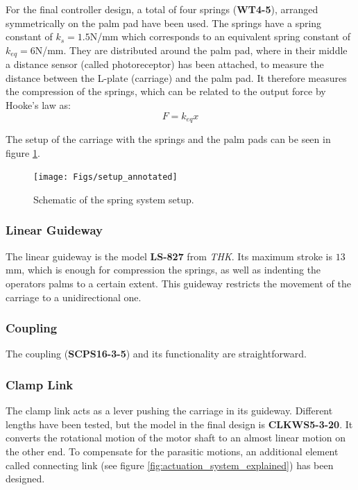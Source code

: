 For the final controller design, a total of four springs (\textbf{WT4-5}), arranged symmetrically on the palm pad have been used. The springs have a spring constant of $k_s = 1.5$N/mm which corresponds to an equivalent spring constant of $k_{eq} = 6$N/mm. They are distributed around the palm pad, where in their middle a distance sensor (called photoreceptor) has been attached, to measure the distance between the L-plate (carriage) and the palm pad. It therefore measures the compression of the springs, which can be related to the output force by Hooke's law as:
\begin{equation}
	F = k_{eq}x 	
\end{equation}

The setup of the carriage with the springs and the palm pads can be seen in figure \ref{fig:setup_annotated}.
\begin{figure}[h!]
	\centering
	\texttt{[image: Figs/setup\_annotated]}
	\caption{Schematic of the spring system setup.}
	\label{fig:setup_annotated}
\end{figure}

\subsubsection{Linear Guideway}
The linear guideway is the model \textbf{LS-827} from \textit{THK}. Its maximum stroke is $13$mm, which is enough for compression the springs, as well as indenting the operators palms to a certain extent. This guideway restricts the movement of the carriage to a unidirectional one.

\subsubsection{Coupling}
The coupling (\textbf{SCPS16-3-5}) and its functionality are straightforward.

\subsubsection{Clamp Link}
The clamp link acts as a lever pushing the carriage in its guideway. Different lengths have been tested, but the model in the final design is \textbf{CLKWS5-3-20}. It converts the rotational motion of the motor shaft to an almost linear motion on the other end. To compensate for the parasitic motions, an additional element called connecting link (see figure \ref{fig:actuation_system_explained}) has been designed.  



\newpage